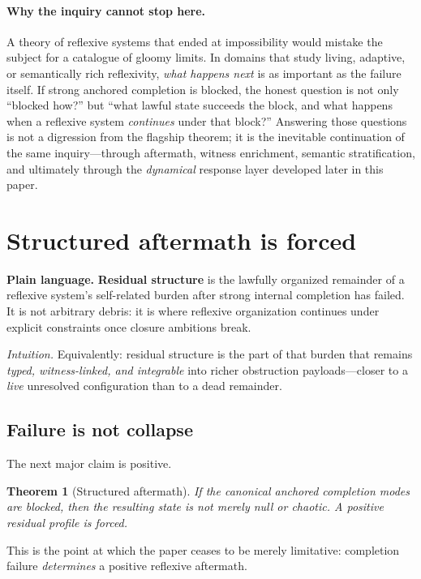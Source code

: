 \documentclass[11pt]{article}
\theoremstyle{plain}
\newtheorem{theorem}{Theorem}[section]
\theoremstyle{definition}
\theoremstyle{remark}
\begin{document}
\paragraph{Why the inquiry cannot stop here.}
A theory of reflexive systems that ended at impossibility would mistake the subject for a catalogue of gloomy limits. In domains that study living, adaptive, or semantically rich reflexivity, \emph{what happens next} is as important as the failure itself. If strong anchored completion is blocked, the honest question is not only ``blocked how?'' but ``what lawful state succeeds the block, and what happens when a reflexive system \emph{continues} under that block?'' Answering those questions is not a digression from the flagship theorem; it is the inevitable continuation of the same inquiry---through aftermath, witness enrichment, semantic stratification, and ultimately through the \emph{dynamical} response layer developed later in this paper.

\section{Structured aftermath is forced}

\noindent\textbf{Plain language.} \textbf{Residual structure} is the lawfully organized remainder of a reflexive system's self-related burden after strong internal completion has failed. It is not arbitrary debris: it is where reflexive organization continues under explicit constraints once closure ambitions break.

\noindent\emph{Intuition.} Equivalently: residual structure is the part of that burden that remains \emph{typed, witness-linked, and integrable} into richer obstruction payloads---closer to a \emph{live} unresolved configuration than to a dead remainder.

\subsection{Failure is not collapse}

The next major claim is positive.

\begin{theorem}[Structured aftermath]
If the canonical anchored completion modes are blocked, then the resulting state is not merely null or chaotic. A positive residual profile is forced.
\end{theorem}

This is the point at which the paper ceases to be merely limitative: completion failure \emph{determines} a positive reflexive aftermath.
\end{document}
